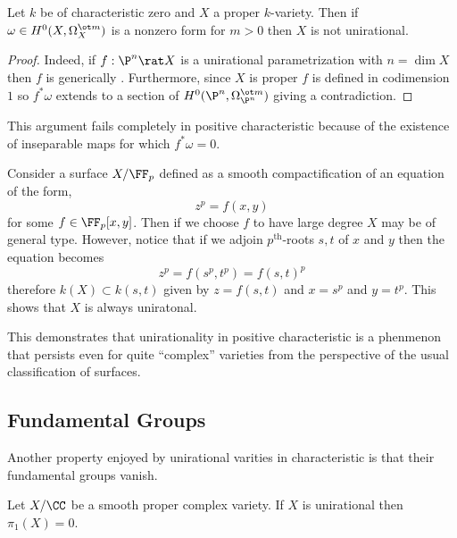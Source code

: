 \documentclass[12pt]{article}
\begin{document}
\begin{prop}
Let $k$ be of characteristic zero and $X$ a proper $k$-variety. Then if $\omega \in H^0(X, \Omega_X^{\ot m})$ is a nonzero form for $m > 0$ then $X$ is not unirational.
\end{prop}

\begin{proof}
Indeed, if $f : \P^n \rat X$ is a unirational parametrization with $n = \dim{X}$ then $f$ is generically \etale. Furthermore, since $X$ is proper $f$ is defined in codimension $1$ so $f^* \omega$ extends to a section of $H^0(\P^n, \Omega_{\P^n}^{\ot m})$ giving a contradiction. 
\end{proof}

This argument fails completely in positive characteristic because of the existence of inseparable maps for which $f^* \omega = 0$.

\begin{example}
Consider a surface $X / \FF_p$ defined as a smooth compactification of an equation of the form,
\[ z^p = f(x,y) \]
for some $f \in \FF_p[x,y]$. Then if we choose $f$ to have large degree $X$ may be of general type. However, notice that if we adjoin $p^{\text{th}}$-roots $s,t$ of $x$ and $y$ then the equation becomes
\[ z^p = f(s^p, t^p) = f(s,t)^p \]
therefore $k(X) \subset k(s,t)$ given by $z = f(s,t)$ and $x = s^p$ and $y = t^p$. This shows that $X$ is always uniratonal. 
\end{example}

This demonstrates that unirationality in positive characteristic is a phenmenon that persists even for quite ``complex'' varieties from the perspective of the usual classification of surfaces. 

\subsection{Fundamental Groups}

Another property enjoyed by unirational varities in characteristic is that their fundamental groups vanish.

\begin{prop}
Let $X / \CC$ be a smooth proper complex variety. If $X$ is unirational then $\pi_1(X) = 0$.
\end{prop} 
\end{document}
